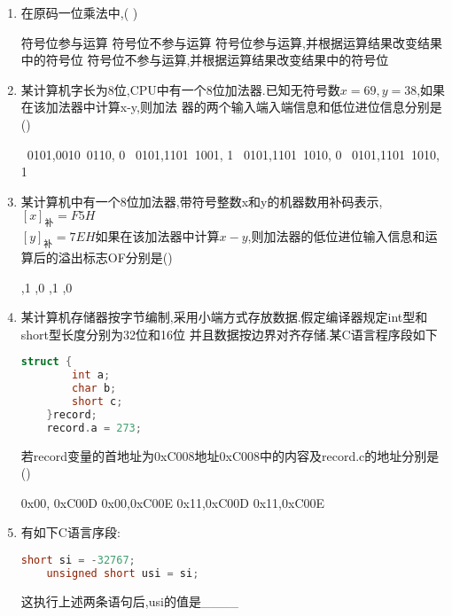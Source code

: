 \documentclass[12pt, a4paper, oneside, UTF8]{ctexbook}
\begin{document}
\begin{enumerate}
    \item 在原码一位乘法中,(   ) 
    \begin{choices}[1]
        \task 符号位参与运算
        \task 符号位不参与运算
        \task 符号位参与运算,并根据运算结果改变结果中的符号位
        \task 符号位不参与运算,并根据运算结果改变结果中的符号位
    \end{choices}


    \item \bl 某计算机字长为8位,CPU中有一个8位加法器.已知无符号数$x=69,y=38$,如果在该加法器中计算x-y,则加法
    器的两个输入端入端信息和低位进位信息分别是() 
    \begin{choices}[2]
        \ 0101,0010\ 0110, 0
        \ 0101,1101\ 1001, 1
        \ 0101,1101\ 1010, 0
        \ 0101,1101\ 1010, 1
    \end{choices}

    \item 某计算机中有一个8位加法器,带符号整数x和y的机器数用补码表示,$[x]_{\text{补}}=F5H$\\ 
    $[y]_{\text{补}}=7EH$如果在该加法器中计算$x-y$,则加法器的低位进位输入信息和运算后的溢出标志OF分别是()
    \begin{choices}
        ,1 
        ,0
        ,1 
        ,0
    \end{choices}

    \item \bt 某计算机存储器按字节编制,采用小端方式存放数据.假定编译器规定int型和short型长度分别为32位和16位
    并且数据按边界对齐存储.某C语言程序段如下
    \begin{center}
    \begin{lstlisting}[language=C]
    struct {
        int a;
        char b;
        short c;
    }record;
    record.a = 273;
    \end{lstlisting}
    \end{center}
    若record变量的首地址为0xC008地址0xC008中的内容及record.c的地址分别是()
    \begin{choices}
        \task 0x00, 0xC00D
        \task 0x00,0xC00E
        \task 0x11,0xC00D
        \task 0x11,0xC00E
    \end{choices}


    \item \bt 有如下C语言序段:
    \begin{lstlisting}[language=C]
    short si = -32767;
    unsigned short usi = si;
    \end{lstlisting}
    这执行上述两条语句后,usi的值是\_\_\_\_ 


\end{enumerate}
\end{document}
